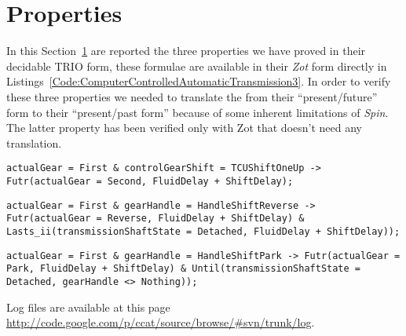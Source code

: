 \section{Properties}
\label{Section:Properties}
In this Section~\ref{Section:Properties} are reported the three properties we have proved in their decidable TRIO form, these formulae are available in their \emph{Zot} form directly in Listings~\ref{Code:ComputerControlledAutomaticTransmission3}. In order to verify these three properties we needed to translate the from their ``present/future'' form to their ``present/past form'' because of some inherent limitations of \emph{Spin}. The latter property has been verified only with Zot that doesn't need any translation.

\begin{lstlisting}[language=TRIO,basicstyle=\small,breaklines,breakatwhitespace,frame=single,caption=Property 1,label=Code:Property1]
actualGear = First & controlGearShift = TCUShiftOneUp -> Futr(actualGear = Second, FluidDelay + ShiftDelay);
\end{lstlisting}

\begin{lstlisting}[language=TRIO,basicstyle=\small,breaklines,breakatwhitespace,frame=single,caption=Property 2,label=Code:Property2]
actualGear = First & gearHandle = HandleShiftReverse -> Futr(actualGear = Reverse, FluidDelay + ShiftDelay) & Lasts_ii(transmissionShaftState = Detached, FluidDelay + ShiftDelay));
\end{lstlisting}

\begin{lstlisting}[language=TRIO,basicstyle=\small,breaklines,breakatwhitespace,frame=single,caption=Property 3,label=Code:Property3]
actualGear = First & gearHandle = HandleShiftPark -> Futr(actualGear = Park, FluidDelay + ShiftDelay) & Until(transmissionShaftState = Detached, gearHandle <> Nothing));
\end{lstlisting}

Log files are available at this page \url{http://code.google.com/p/ccat/source/browse/#svn/trunk/log}.

